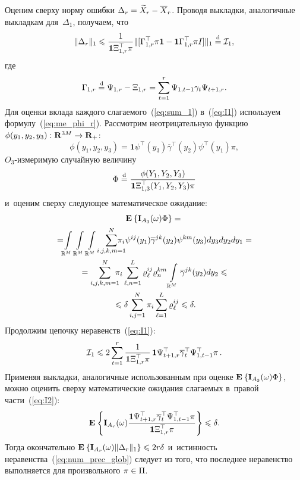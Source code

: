 \begin{multicols}{2}
{Оценим сверху норму ошибки $\Delta_r\hm = \widetilde{X}_r\hm - \overline{X}_r$. 
Проводя выкладки, аналогичные выкладкам для~$\Delta_1$, получаем, что
\begin{equation}
\|\Delta_r\|_1 \leqslant 
\displaystyle\frac{\displaystyle 1\mathstrut}{\displaystyle \mathbf{1}\Xi_{1,r}^{\top}\pi\mathstrut}
\|
[
\Gamma_{1,r}^{\top}\pi \mathbf{1}-
\mathbf{1}\Gamma_{1,r}^{\top}\pi I 
]\|_1 \stackrel{\mathrm{d}}{=} \mathcal{I}_1,
\label{eq:I1}
\end{equation}
где 
\begin{equation}
\Gamma_{1,r} \stackrel{\mathrm{d}}{=} \Psi_{1,r} - \Xi_{1,r} = 
\sum\limits_{t=1}^r \Psi_{1,t-1}\gamma_t\Psi_{t+1,r}.
\label{eq:sum_1}
\end{equation}
Для оценки вклада каждого слагаемого~(\ref{eq:sum_1}) в~(\ref{eq:I1})
используем формулу~(\ref{eq:me_phi_r}). Рассмотрим неотрицательную 
функцию $\phi(y_1,y_2,y_3):\mathbf{R}^{3M} \hm\to \mathbf{R}_+$:
\begin{equation*}
\phi(y_1,y_2,y_3)=\mathbf{1}\psi^{\top}(y_3)\overline{\gamma}^{\top}(y_2)
\psi^{\top}(y_1)\pi,
\end{equation*}
$O_3$-измеримую случайную величину
$$
\Phi \stackrel{\mathrm{d}}{=} 
\displaystyle\frac{\displaystyle \phi(Y_1,Y_2,Y_3)\mathstrut}{\displaystyle \mathbf{1}\Xi_{1,3}^{\top}(Y_1,Y_2,Y_3)\pi\mathstrut}
$$ 
и~оценим сверху следующее математическое ожидание: 
\begin{multline*}
\me{}{\mathbf{I}_{A_3}(\omega)\Phi} ={} \\
{} =\!\!
\int\limits_{\mathbb{R}^M}\int\limits_{\mathbb{R}^M}\int\limits_{\mathbb{R}^M}
\!\sum\limits_{i,j,k,m=1}^N \!\!\!\!\!\!\!
\pi_i\psi^{ij}(y_1)\overline{\gamma}^{jk}(y_2)\psi^{km}(y_3)dy_3dy_2dy_1={} \\
{} =
\sum\limits_{i,j,k,m=1}^N \!\! \!\!\pi_i 
\sum\limits_{\ell,n=1}^L \varrho_{\ell}^{ij}\varrho_{n}^{km}
\int\limits_{\mathbb{R}^M} \overline{\gamma}^{jk}(y_2)dy_2 \leqslant{}\\
{}\leqslant
\delta \sum\limits_{i,j=1}^N \pi_i 
\sum\limits_{\ell=1}^L \varrho_{\ell}^{ij} %
\leqslant \delta.
\end{multline*}
Продолжим цепочку неравенств~(\ref{eq:I1}):
\begin{equation}
\mathcal{I}_1 \leqslant 2 \sum\limits_{t=1}^r \displaystyle\frac{\displaystyle 1\mathstrut}{\displaystyle \mathbf{1}\Xi_{1,r}^{\top}\pi\mathstrut}\,
\mathbf{1}\Psi_{t+1,r}^{\top}\overline{\gamma}_{t}^{\top}\Psi_{1,t-1}^{\top}\pi\,.
\label{eq:I2}
\end{equation}
Применяя выкладки, аналогичные использованным при оценке 
$\mathbf{E}_{  }\left\{ \mathop{\mathbf{I}_{A_3}(\omega)\Phi} \right\}$, можно оценить сверху математические 
ожидания слагаемых в~правой части~(\ref{eq:I2}):
$$
\mathbf{E}_{  }\left\{ \mathop{\mathbf{I}_{A_r}(\omega)\displaystyle\frac{\displaystyle 
\mathbf{1}\Psi_{t+1,r}^{\top}\overline{\gamma}_{t}^{\top}\Psi_{1,t-1}^{\top}\pi
\mathstrut}{\displaystyle 
\mathbf{1}\Xi_{1,r}^{\top}\pi
\mathstrut}} \right\} \leqslant
\delta.
$$
Тогда окончательно
$
\me{}{\mathbf{I}_{A_r}(\omega)\|\Delta_r\|_1} \hm\leqslant
2r \delta
$
и~истинность неравенства~(\ref{eq:num_prec_glob}) 
 следует из того, что последнее неравенство выполняется для произвольного $\pi\hm \in \Pi$.
 
}
\end{multicols}

